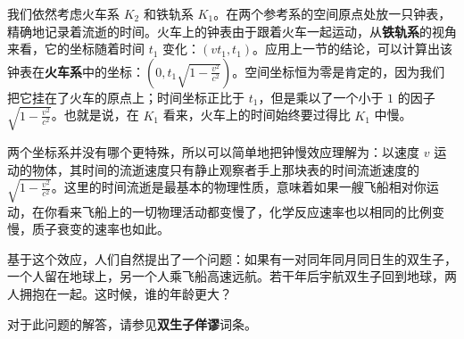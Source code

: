 我们依然考虑火车系 $K_2$ 和铁轨系 $K_1$。在两个参考系的空间原点处放一只钟表，精确地记录着流逝的时间。火车上的钟表由于跟着火车一起运动，从\textbf{铁轨系}的视角来看，它的坐标随着时间 $t_1$ 变化：$(vt_1, t_1)$。应用上一节的结论，可以计算出该钟表在\textbf{火车系}中的坐标：$(0, t_1\sqrt{1-\frac{v^2}{c^2}})$。空间坐标恒为零是肯定的，因为我们把它挂在了火车的原点上；时间坐标正比于 $t_1$，但是乘以了一个小于 $1$ 的因子 $\sqrt{1-\frac{v^2}{c^2}}$。也就是说，在 $K_1$ 看来，火车上的时间始终要过得比 $K_1$ 中慢。

两个坐标系并没有哪个更特殊，所以可以简单地把钟慢效应理解为：以速度 $v$ 运动的物体，其时间的流逝速度只有静止观察者手上那块表的时间流逝速度的 $\sqrt{1-\frac{v^2}{c^2}}$。这里的时间流逝是最基本的物理性质，意味着如果一艘飞船相对你运动，在你看来飞船上的一切物理活动都变慢了，化学反应速率也以相同的比例变慢，质子衰变的速率也如此。

基于这个效应，人们自然提出了一个问题：如果有一对同年同月同日生的双生子，一个人留在地球上，另一个人乘飞船高速远航。若干年后宇航双生子回到地球，两人拥抱在一起。这时候，谁的年龄更大？

对于此问题的解答，请参见\textbf{双生子佯谬}词条。
